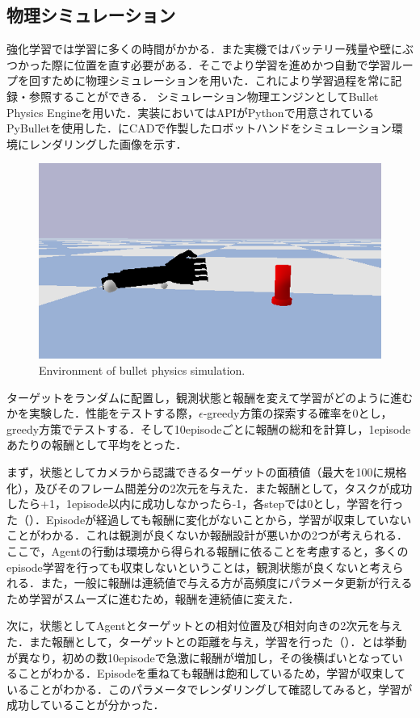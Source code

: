 \subsection{物理シミュレーション}
強化学習では学習に多くの時間がかかる．また実機ではバッテリー残量や壁にぶつかった際に位置を直す必要がある．そこでより学習を進めかつ自動で学習ループを回すために物理シミュレーションを用いた．これにより学習過程を常に記録・参照することができる．
シミュレーション物理エンジンとしてBullet Physics Engineを用いた．実装においてはAPIがPythonで用意されているPyBulletを使用した．にCADで作製したロボットハンドをシミュレーション環境にレンダリングした画像を示す．

\begin{figure}[H]
    \centering
    \includegraphics[width=0.7\linewidth]{figure/chapter3/bullet_demo}
    \caption{Environment of bullet physics simulation.}
    \label{fig:1号機simu}
\end{figure}


ターゲットをランダムに配置し，観測状態と報酬を変えて学習がどのように進むかを実験した．性能をテストする際，$\epsilon$-greedy方策の探索する確率を0とし，greedy方策でテストする．そして10episodeごとに報酬の総和を計算し，1episodeあたりの報酬として平均をとった．

まず，状態としてカメラから認識できるターゲットの面積値（最大を100に規格化），及びそのフレーム間差分の2次元を与えた．また報酬として，タスクが成功したら+1，1episode以内に成功しなかったら-1，各stepでは0とし，学習を行った（）．Episodeが経過しても報酬に変化がないことから，学習が収束していないことがわかる．これは観測が良くないか報酬設計が悪いかの2つが考えられる．ここで，Agentの行動は環境から得られる報酬に依ることを考慮すると，多くのepisode学習を行っても収束しないということは，観測状態が良くないと考えられる．また，一般に報酬は連続値で与える方が高頻度にパラメータ更新が行えるため学習がスムーズに進むため，報酬を連続値に変えた．

次に，状態としてAgentとターゲットとの相対位置及び相対向きの2次元を与えた．また報酬として，ターゲットとの距離を与え，学習を行った（）．とは挙動が異なり，初めの数10episodeで急激に報酬が増加し，その後横ばいとなっていることがわかる．Episodeを重ねても報酬は飽和しているため，学習が収束していることがわかる．このパラメータでレンダリングして確認してみると，学習が成功していることが分かった．

